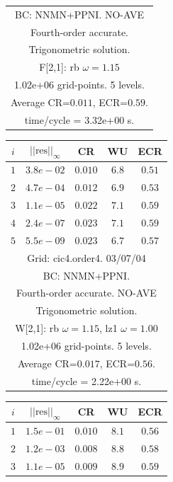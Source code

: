 \begin{table}[hbt]
\begin{center}
{\begin{tabular}{|c|c|c|c|c|}
\multicolumn{5}{|c|}{BC: NNMN+PPNI. NO-AVE}  \\
\multicolumn{5}{|c|}{Fourth-order accurate.}  \\
\multicolumn{5}{|c|}{Trigonometric solution.}  \\
\multicolumn{5}{|c|}{F[2,1]: rb $\omega=1.15$}  \\
\multicolumn{5}{|c|}{1.02e+06 grid-points. 5 levels.}  \\
\multicolumn{5}{|c|}{Average CR=$0.011$, ECR=$0.59$.}  \\
\multicolumn{5}{|c|}{time/cycle = 3.32e+00 s.}  \\
\hline 
\end{tabular}
\begin{tabular}{|c|c|c|c|c|} \hline 
 $i$   & $\vert\vert\mbox{res}\vert\vert_\infty$  &  CR     &  WU    & ECR  \\   \hline 
 $ 1$  & $ 3.8e-02$ & $0.010$ & $ 6.8$ & $0.51$ \\ 
 $ 2$  & $ 4.7e-04$ & $0.012$ & $ 6.9$ & $0.53$ \\ 
 $ 3$  & $ 1.1e-05$ & $0.022$ & $ 7.1$ & $0.59$ \\ 
 $ 4$  & $ 2.4e-07$ & $0.023$ & $ 7.1$ & $0.59$ \\ 
 $ 5$  & $ 5.5e-09$ & $0.023$ & $ 6.7$ & $0.57$ \\ 
\hline 
\multicolumn{5}{|c|}{Grid: cic4.order4. 03/07/04}  \\
\multicolumn{5}{|c|}{BC: NNMN+PPNI.}  \\
\multicolumn{5}{|c|}{Fourth-order accurate. NO-AVE}  \\
\multicolumn{5}{|c|}{Trigonometric solution.}  \\
\multicolumn{5}{|c|}{W[2,1]: rb $\omega=1.15$, lz1 $\omega=1.00$}  \\
\multicolumn{5}{|c|}{1.02e+06 grid-points. 5 levels.}  \\
\multicolumn{5}{|c|}{Average CR=$0.017$, ECR=$0.56$.}  \\
\multicolumn{5}{|c|}{time/cycle = 2.22e+00 s.}  \\
\hline 
\end{tabular}
\begin{tabular}{|c|c|c|c|c|} \hline 
 $i$   & $\vert\vert\mbox{res}\vert\vert_\infty$  &  CR     &  WU    & ECR  \\   \hline 
 $ 1$  & $ 1.5e-01$ & $0.010$ & $ 8.1$ & $0.56$ \\ 
 $ 2$  & $ 1.2e-03$ & $0.008$ & $ 8.8$ & $0.58$ \\ 
 $ 3$  & $ 1.1e-05$ & $0.009$ & $ 8.9$ & $0.59$ \\ 

\end{tabular}}
\end{center}
\end{table}
